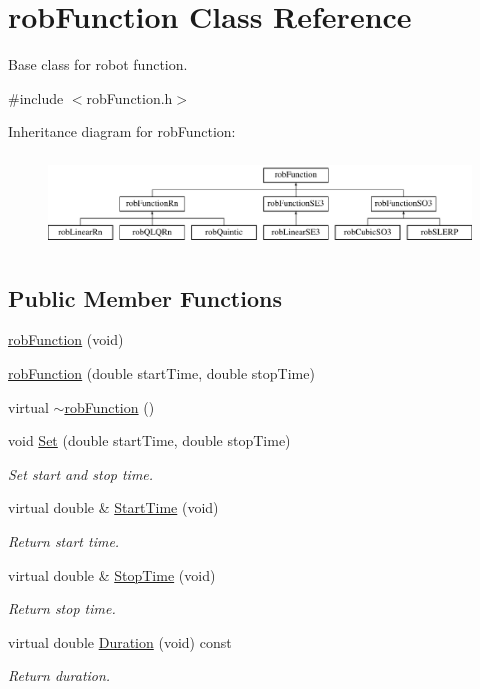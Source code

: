 \hypertarget{classrob_function}{\section{rob\-Function Class Reference}
\label{classrob_function}
}


Base class for robot function.  




{\ttfamily \#include $<$rob\-Function.\-h$>$}

Inheritance diagram for rob\-Function\-:\begin{figure}[H]
\begin{center}
\leavevmode
\includegraphics[height=2.477876cm]{df/d7c/classrob_function}
\end{center}
\end{figure}
\subsection*{Public Member Functions}
\begin{DoxyCompactItemize}
\item 
\hyperlink{classrob_function_a87a3a5ba5776e3ebe18ec09ddea761d2}{rob\-Function} (void)
\item 
\hyperlink{classrob_function_a92c4ae2aa08b0f2e45fcd22b42bb4b2f}{rob\-Function} (double start\-Time, double stop\-Time)
\item 
virtual \hyperlink{classrob_function_aa0047e53fa345aaf5742f804cbdf036c}{$\sim$rob\-Function} ()
\item 
void \hyperlink{classrob_function_ab6c969d6c132e52e313db685735bd02b}{Set} (double start\-Time, double stop\-Time)
\begin{DoxyCompactList}\small\item\em Set start and stop time. \end{DoxyCompactList}\item 
virtual double \& \hyperlink{classrob_function_a7cc9c026519df2585f917c032464cdc7}{Start\-Time} (void)
\begin{DoxyCompactList}\small\item\em Return start time. \end{DoxyCompactList}\item 
virtual double \& \hyperlink{classrob_function_a1d71358b3cad6ed57998fc3d27add1e6}{Stop\-Time} (void)
\begin{DoxyCompactList}\small\item\em Return stop time. \end{DoxyCompactList}\item 
virtual double \hyperlink{classrob_function_a9a3f87b9233377bef2ad36f346849f67}{Duration} (void) const 
\begin{DoxyCompactList}\small\item\em Return duration. \end{DoxyCompactList}\end{DoxyCompactItemize}
